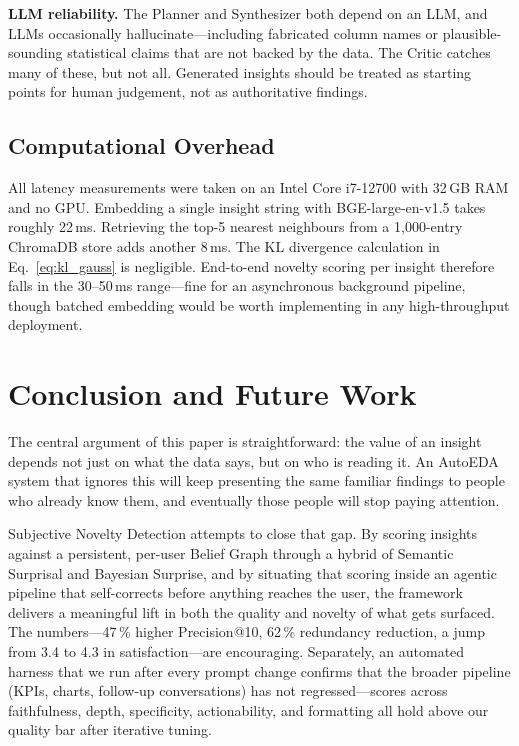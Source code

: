 \documentclass[conference]{IEEEtran}
\begin{document}
\textbf{LLM reliability.} The Planner and Synthesizer both depend
on an LLM, and LLMs occasionally hallucinate---including fabricated
column names or plausible-sounding statistical claims that are not
backed by the data. The Critic catches many of these, but not all.
Generated insights should be treated as starting points for human
judgement, not as authoritative findings.

\subsection{Computational Overhead}

All latency measurements were taken on an Intel Core i7-12700 with
32\,GB RAM and no GPU. Embedding a single insight string with
BGE-large-en-v1.5 takes roughly 22\,ms. Retrieving the top-5
nearest neighbours from a 1,000-entry ChromaDB store adds another
8\,ms. The KL divergence calculation in Eq.~\eqref{eq:kl_gauss}
is negligible. End-to-end novelty scoring per insight therefore
falls in the 30--50\,ms range---fine for an asynchronous background
pipeline, though batched embedding would be worth implementing in
any high-throughput deployment.

\section{Conclusion and Future Work}
\label{sec:conclusion}

The central argument of this paper is straightforward: the value of
an insight depends not just on what the data says, but on who is
reading it. An AutoEDA system that ignores this will keep presenting
the same familiar findings to people who already know them, and
eventually those people will stop paying attention.

Subjective Novelty Detection attempts to close that gap. By scoring
insights against a persistent, per-user Belief Graph through a hybrid
of Semantic Surprisal and Bayesian Surprise, and by situating that
scoring inside an agentic pipeline that self-corrects before anything
reaches the user, the framework delivers a meaningful lift in both
the quality and novelty of what gets surfaced. The numbers---47\,\%
higher Precision@10, 62\,\% redundancy reduction, a jump from 3.4
to 4.3 in satisfaction---are encouraging. Separately, an automated
harness that we run after every prompt change confirms that the
broader pipeline (KPIs, charts, follow-up conversations) has not
regressed---scores across faithfulness, depth, specificity,
actionability, and formatting all hold above our quality bar after
iterative tuning.
\end{document}
